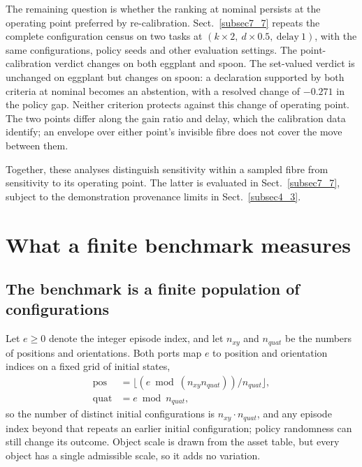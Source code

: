 \documentclass[pdflatex,iicol,sn-apa]{sn-jnl}
\theoremstyle{remark}
\begin{document}
The remaining question is whether the ranking at nominal persists at the operating point
preferred by re-calibration. Sect.~\ref{subsec7_7} repeats the complete configuration census on two
tasks at $(k{\times}2,\ d{\times}0.5,\ \text{delay}\ 1)$, with the same configurations, policy seeds
and other evaluation settings.
The point-calibration verdict changes on both eggplant and spoon. The set-valued verdict is
unchanged on eggplant but changes on spoon: a declaration supported by both criteria at nominal
becomes an abstention, with a resolved change of $-0.271$ in the policy gap. Neither criterion
protects against this change of operating point. The two points differ along the gain ratio and
delay, which the calibration data identify; an envelope over either point's invisible fibre
does not cover the move between them.

Together, these analyses distinguish sensitivity within a sampled fibre from sensitivity to
its operating point. The latter is evaluated in Sect.~\ref{subsec7_7}, subject to the demonstration
provenance limits in Sect.~\ref{subsec4_3}.

\section{What a finite benchmark measures}\label{sec5}

\subsection{The benchmark is a finite population of configurations}\label{subsec5_1}

Let $e\geq0$ denote the integer episode index, and let $n_{xy}$ and $n_{quat}$ be the numbers of positions and orientations. Both ports map $e$ to position and orientation indices on a fixed grid of initial states,
\begin{align}
\mathrm{pos}  &= \big\lfloor (e \bmod (n_{xy} n_{quat})) / n_{quat} \big\rfloor, \\
\mathrm{quat} &= e \bmod n_{quat},
\end{align}
so the number of distinct initial configurations is $n_{xy} \cdot n_{quat}$, and any episode index
beyond that repeats an earlier initial configuration; policy randomness can still change its
outcome. Object scale is drawn from the asset table, but every
object has a single admissible scale, so it adds no variation.
\end{document}

